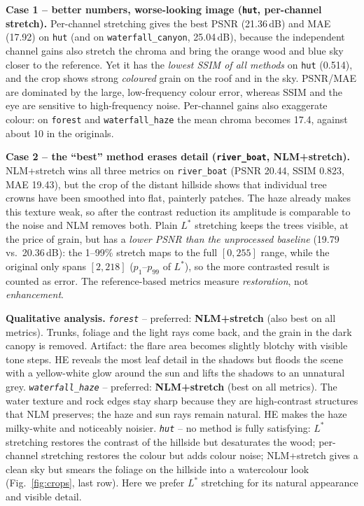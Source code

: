 \documentclass[10pt,a4paper]{article}
\begin{document}
\textbf{Case 1 -- better numbers, worse-looking image (\texttt{hut}, per-channel stretch).} Per-channel stretching
gives the best PSNR (21.36\,dB) and MAE (17.92) on \texttt{hut} (and on \texttt{waterfall\_canyon}, 25.04\,dB),
because the independent channel gains also stretch the chroma and bring the orange wood and blue sky closer to the
reference. Yet it has the \emph{lowest SSIM of all methods} on \texttt{hut} (0.514), and the crop shows strong
\emph{coloured} grain on the roof and in the sky. PSNR/MAE are dominated by the large, low-frequency colour error,
whereas SSIM and the eye are sensitive to high-frequency noise. Per-channel gains also exaggerate colour:
on \texttt{forest} and \texttt{waterfall\_haze} the mean chroma becomes 17.4, against about 10 in the originals.

\textbf{Case 2 -- the ``best'' method erases detail (\texttt{river\_boat}, NLM+stretch).} NLM+stretch wins all three
metrics on \texttt{river\_boat} (PSNR 20.44, SSIM 0.823, MAE 19.43), but the crop of the distant hillside shows that
individual tree crowns have been smoothed into flat, painterly patches. The haze already makes this texture weak,
so after the contrast reduction its amplitude is comparable to the noise and NLM removes both. Plain $L^*$
stretching keeps the trees visible, at the price of grain, but has a \emph{lower PSNR than the unprocessed baseline}
(19.79 vs.\ 20.36\,dB): the 1--99\% stretch maps to the full $[0,255]$ range, while the original only spans
$[2,218]$ ($p_1$--$p_{99}$ of $L^*$), so the more contrasted result is counted as error. The reference-based
metrics measure \emph{restoration}, not \emph{enhancement}.

\textbf{Qualitative analysis.}
\emph{\texttt{forest}} -- preferred: \textbf{NLM+stretch} (also best on all metrics). Trunks, foliage and the
light rays come back, and the grain in the dark canopy is removed. Artifact: the flare area becomes slightly
blotchy with visible tone steps. HE reveals the most leaf detail in the shadows but floods the scene with a
yellow-white glow around the sun and lifts the shadows to an unnatural grey.
\emph{\texttt{waterfall\_haze}} -- preferred: \textbf{NLM+stretch} (best on all metrics). The water texture and rock
edges stay sharp because they are high-contrast structures that NLM preserves; the haze and sun rays remain
natural. HE makes the haze milky-white and noticeably noisier.
\emph{\texttt{hut}} -- no method is fully satisfying: $L^*$ stretching restores the contrast of the hillside but
desaturates the wood; per-channel stretching restores the colour but adds colour noise; NLM+stretch gives a clean
sky but smears the foliage on the hillside into a watercolour look (Fig.~\ref{fig:crops}, last row). Here we
prefer $L^*$ stretching for its natural appearance and visible detail.
\end{document}
